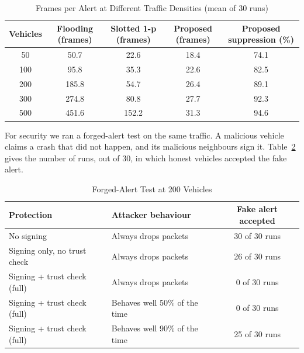 \documentclass[11pt, a4paper]{article}
\begin{document}
\begin{table}[H]
    \centering
    \footnotesize
    \renewcommand{\arraystretch}{1.2}
    \begin{tabular}{|c|c|c|c|c|}
        \hline
        \textbf{Vehicles} & \textbf{Flooding (frames)} & \textbf{Slotted 1-p (frames)} & \textbf{Proposed (frames)} & \textbf{Proposed suppression (\%)} \\
        \hline
        50  & 50.7  & 22.6  & 18.4 & 74.1 \\ \hline
        100 & 95.8  & 35.3  & 22.6 & 82.5 \\ \hline
        200 & 185.8 & 54.7  & 26.4 & 89.1 \\ \hline
        300 & 274.8 & 80.8  & 27.7 & 92.3 \\ \hline
        500 & 451.6 & 152.2 & 31.3 & 94.6 \\ \hline
    \end{tabular}
    \caption{Frames per Alert at Different Traffic Densities (mean of 30 runs)}
    \label{tab:density}
\end{table}

\noindent
For security we ran a forged-alert test on the same traffic. A malicious vehicle claims a crash that did not happen, and its malicious neighbours sign it. Table~\ref{tab:forge} gives the number of runs, out of 30, in which honest vehicles accepted the fake alert.

\begin{table}[H]
    \centering
    \footnotesize
    \renewcommand{\arraystretch}{1.2}
    \begin{tabular}{|p{5.6cm}|p{5.2cm}|c|}
        \hline
        \textbf{Protection} & \textbf{Attacker behaviour} & \textbf{Fake alert accepted} \\
        \hline
        No signing & Always drops packets & 30 of 30 runs \\ \hline
        Signing only, no trust check & Always drops packets & 26 of 30 runs \\ \hline
        Signing + trust check (full) & Always drops packets & 0 of 30 runs \\ \hline
        Signing + trust check (full) & Behaves well 50\% of the time & 0 of 30 runs \\ \hline
        Signing + trust check (full) & Behaves well 90\% of the time & 25 of 30 runs \\ \hline
    \end{tabular}
    \caption{Forged-Alert Test at 200 Vehicles}
    \label{tab:forge}
\end{table}
\end{document}
